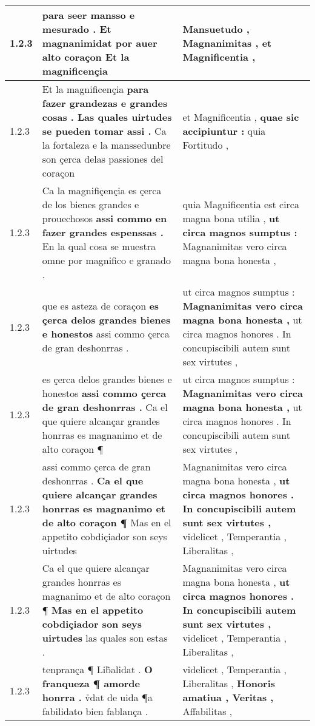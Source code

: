 \begin{tabular}{|p{1cm}|p{6.5cm}|p{6.5cm}|}
1.2.3 & para seer mansso e mesurado . \textbf{ Et magnanimidat por auer alto coraçon } Et la magnificençia & Mansuetudo , \textbf{ Magnanimitas , } et Magnificentia , \\\hline
1.2.3 & Et la magnificençia \textbf{ para fazer grandezas e grandes cosas . Las quales uirtudes se pueden tomar assi . } Ca la fortaleza e la manssedunbre son çerca delas passiones del coraçon & et Magnificentia , \textbf{ quae sic accipiuntur : } quia Fortitudo , \\\hline
1.2.3 & Ca la magnifiçençia es çerca de los bienes grandes e prouechosos \textbf{ assi commo en fazer grandes espenssas . } En la qual cosa se muestra omne por magnifico e granado . & quia Magnificentia est circa magna bona utilia , \textbf{ ut circa magnos sumptus : } Magnanimitas vero circa magna bona honesta , \\\hline
1.2.3 & que es asteza de coraçon \textbf{ es çerca delos grandes bienes e honestos } assi commo çerca de gran deshonrras . & ut circa magnos sumptus : \textbf{ Magnanimitas vero circa magna bona honesta , } ut circa magnos honores . In concupiscibili autem sunt sex virtutes , \\\hline
1.2.3 & es çerca delos grandes bienes e honestos \textbf{ assi commo çerca de gran deshonrras . } Ca el que quiere alcançar grandes honrras es magnanimo et de alto coraçon ¶ & ut circa magnos sumptus : \textbf{ Magnanimitas vero circa magna bona honesta , } ut circa magnos honores . In concupiscibili autem sunt sex virtutes , \\\hline
1.2.3 & assi commo çerca de gran deshonrras . \textbf{ Ca el que quiere alcançar grandes honrras es magnanimo et de alto coraçon ¶ } Mas en el appetito cobdiçiador son seys uirtudes & Magnanimitas vero circa magna bona honesta , \textbf{ ut circa magnos honores . In concupiscibili autem sunt sex virtutes , } videlicet , Temperantia , Liberalitas , \\\hline
1.2.3 & Ca el que quiere alcançar grandes honrras es magnanimo et de alto coraçon ¶ \textbf{ Mas en el appetito cobdiçiador son seys uirtudes } las quales son estas . & Magnanimitas vero circa magna bona honesta , \textbf{ ut circa magnos honores . In concupiscibili autem sunt sex virtutes , } videlicet , Temperantia , Liberalitas , \\\hline
1.2.3 & tenprança ¶ Lib̃alidat . \textbf{ O franqueza ¶ amorde honrra . } v̉dat de uida ¶a fabilidato bien fablança . & videlicet , Temperantia , Liberalitas , \textbf{ Honoris amatiua , Veritas , } Affabilitas , \\\hline

\end{tabular}
